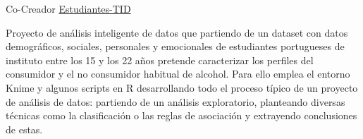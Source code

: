 


\begin{cventries}





\cventry
{Co-Creador} %
{\href{https://github.com/AythaE/Estudiantes-TID}{Estudiantes-TID}} %
{} %
{} %
{ %
	\begin{cvitems}
		\item {Proyecto de análisis inteligente de datos que partiendo de un dataset con datos demográficos, sociales, personales y emocionales de estudiantes portugueses de instituto entre los 15 y los 22 años pretende caracterizar los perfiles del consumidor y el no consumidor habitual de alcohol. Para ello emplea el entorno Knime y algunos scripts en R desarrollando todo el proceso típico de un proyecto de análisis de datos: partiendo de un análisis exploratorio, planteando diversas técnicas como la clasificación o las reglas de asociación y extrayendo conclusiones de estas.}
	\end{cvitems}
}



\end{cventries}
